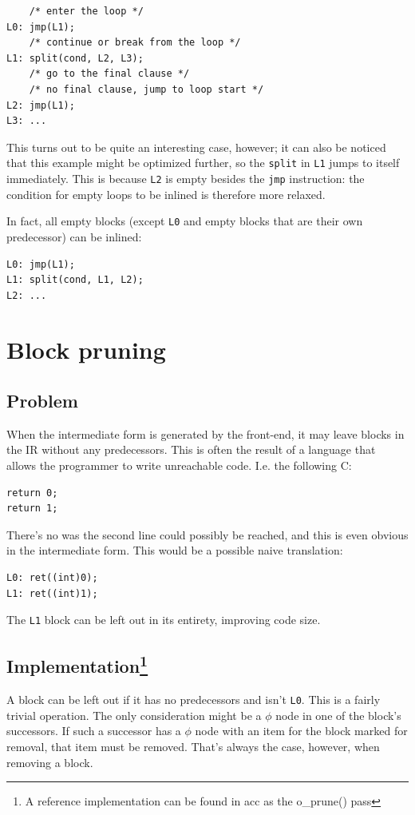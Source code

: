 \documentclass[12pt, a4paper]{article}
\begin{document}
\begin{lstlisting}
	/* enter the loop */
L0:	jmp(L1);
	/* continue or break from the loop */
L1:	split(cond, L2, L3);
	/* go to the final clause */
	/* no final clause, jump to loop start */
L2:	jmp(L1);
L3:	...
\end{lstlisting}

This turns out to be quite an interesting case, however; it can also be noticed
that this example might be optimized further, so the \verb+split+ in \verb+L1+
jumps to itself immediately. This is because \verb+L2+ is empty besides the \verb+jmp+
instruction: the condition for empty loops to be inlined is therefore more relaxed.

In fact, all empty blocks (except \verb+L0+ and empty blocks that are their own predecessor) can be inlined:

\begin{lstlisting}
L0:	jmp(L1);
L1:	split(cond, L1, L2);
L2:	...
\end{lstlisting}

\section{Block pruning}
\subsection{Problem}
When the intermediate form is generated by the front-end, it may leave blocks in
the IR without any predecessors. This is often the result of a language that
allows the programmer to write unreachable code. I.e. the following C:

\begin{lstlisting}
return 0;
return 1;
\end{lstlisting}

There's no was the second line could possibly be reached, and this is even obvious
in the intermediate form. This would be a possible naive translation:

\begin{lstlisting}
L0:	ret((int)0);
L1:	ret((int)1);
\end{lstlisting}

The \verb+L1+ block can be left out in its entirety, improving code size.

\subsection[Implementation]{Implementation\footnote{A reference implementation
can be found in acc as the o\_prune() pass} }
A block can be left out if it has no predecessors and isn't \verb+L0+.
This is a fairly trivial operation. The only consideration might be a $\phi$
node in one of the block's successors. If such a successor has a $\phi$ node with
an item for the block marked for removal, that item must be removed. That's
always the case, however, when removing a block.
\end{document}
